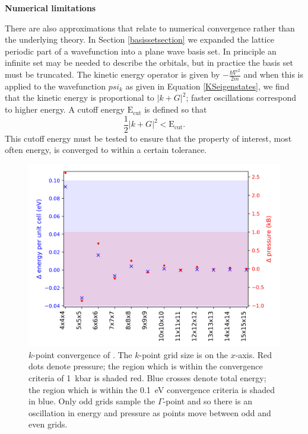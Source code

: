 \textbf{Numerical limitations} 

There are also approximations that relate to numerical convergence rather than the underlying theory.
In Section \ref{basissetsection} we expanded the lattice periodic part of a wavefunction into a plane wave basis set. In principle an infinite set may be needed to describe the orbitals, but in practice the basis set must be truncated. The kinetic energy operator is given by $-\frac{\hbar \nabla^2}{2m}$ and when this is applied to the wavefunction $psi_k$ as given in Equation \ref{KSeigenstates}, we find that the kinetic energy is proportional to $|k+G|^2$; faster oscillations correspond to higher energy. A cutoff energy $\textrm{E}_\textrm{cut}$ is defined so that
\begin{equation}
\frac{1}{2}|k+G|^2 < \textrm{E}_\textrm{cut}.
\end{equation}
This cutoff energy must be tested to ensure that the property of interest, most often energy, is converged to within a certain tolerance.

\begin{figure}[h]
\centering
  \includegraphics[width=0.7\columnwidth]{figures/ch3/kpointconvergence.png}
  \caption[ $k$-point convergence]{$k$-point convergence of . The $k$-point grid size is on the $x$-axis. Red dots denote pressure; the region which is within the convergence criteria of \SI{1}{\kilo\bar} is shaded red. Blue crosses denote total energy; the region which is within the \SI{0.1}{\electronvolt} convergence criteria is shaded in blue. Only odd grids sample the $\Gamma$-point and so there is an oscillation in energy and pressure as points move between odd and even grids.}
  \label{kpointconvergence}
\end{figure}

